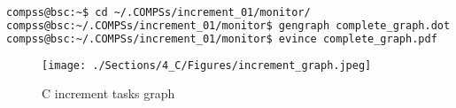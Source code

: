 \begin{lstlisting}[language=bash]
compss@bsc:~$ cd ~/.COMPSs/increment_01/monitor/
compss@bsc:~/.COMPSs/increment_01/monitor$ gengraph complete_graph.dot
compss@bsc:~/.COMPSs/increment_01/monitor$ evince complete_graph.pdf
\end{lstlisting}

\begin{figure}[ht!]
  \centering
    \texttt{[image: ./Sections/4\_C/Figures/increment\_graph.jpeg]}
    \caption{C increment tasks graph} 
    \label{fig:increment_c}
\end{figure}

\newpage
~
